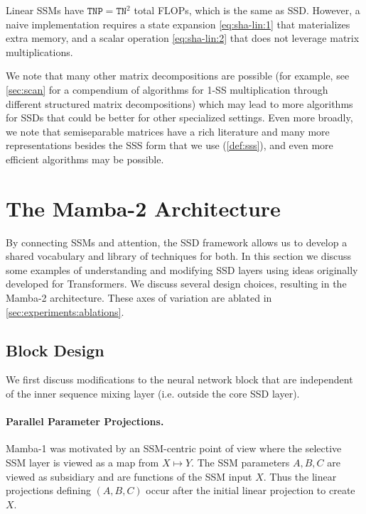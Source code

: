 Linear SSMs have $\mathtt{TNP} = \mathtt{TN}^2$ total FLOPs, which is the same as SSD. However, a naive implementation requires a state expansion \eqref{eq:sha-lin:1} that materializes extra memory, and a scalar operation \eqref{eq:sha-lin:2} that does not leverage matrix multiplications.

\begin{center}

  \label{tab:compute}
\end{center}

We note that many other matrix decompositions are possible (for example, see \ref{sec:scan} for a compendium of algorithms for 1-SS multiplication through different structured matrix decompositions) which may lead to more algorithms for SSDs that could be better for other specialized settings. Even more broadly, we note that semiseparable matrices have a rich literature and many more representations besides the SSS form that we use (\ref{def:sss}),
and even more efficient algorithms may be possible.

\section{The Mamba-2 Architecture}
\label{sec:architecture}

By connecting SSMs and attention, the SSD framework allows us to develop a shared vocabulary and library of techniques for both. In this section we discuss some examples of understanding and modifying SSD layers using ideas originally developed for Transformers. We discuss several design choices, resulting in the Mamba-2 architecture. These axes of variation are ablated in \ref{sec:experiments:ablations}.

\subsection{Block Design}
\label{sec:architecture:block}

We first discuss modifications to the neural network block that are independent of the inner sequence mixing layer (i.e. outside the core SSD layer).

\paragraph{Parallel Parameter Projections.}

Mamba-1 was motivated by an SSM-centric point of view where the selective SSM layer is viewed as a map from $X \mapsto Y$. The SSM parameters $A, B, C$ are viewed as subsidiary and are functions of the SSM input $X$. Thus the linear projections defining $(A, B, C)$ occur after the initial linear projection to create $X$.


